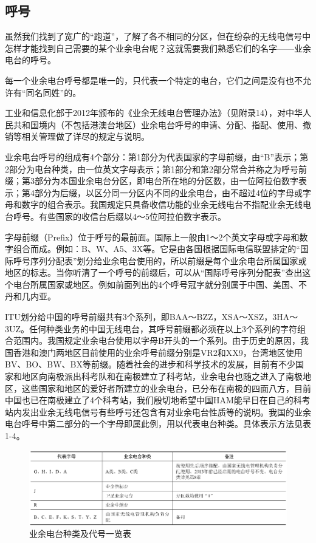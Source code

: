 \documentclass[12pt,UTF8]{ctexbook}
\begin{document}
\subsection{呼号}

虽然我们找到了宽广的“跑道”，了解了各不相同的分区，但在纷杂的无线电信号中怎样才能找到自己需要的某个业余电台呢？这就需要我们熟悉它们的名字——业余电台的呼号。

每一个业余电台呼号都是唯一的，只代表一个特定的电台，它们之间是没有也不允许有“同名同姓”的。

工业和信息化部于2012年颁布的《业余无线电台管理办法》（见附录14），对中华人民共和国境内（不包括港澳台地区）业余电台呼号的申请、分配、指配、使用、撤销等相关管理做了详尽的规定与说明。

业余电台呼号的组成有4个部分：第1部分为代表国家的字母前缀，由“B”表示；第2部分为电台种类，由一位英文字母表示；第1部分和第2部分常合并称之为呼号前缀；第3部分为本国业余电台分区，即电台所在地的分区数，由一位阿拉伯数字表示；第4部分为后缀，以区分同一分区内不同的业余电台，由不超过4位的字母或字母和数字的组合表示。我国规定只具备收信功能的业余无线电台不指配业余无线电台呼号。有些国家的收信台后缀以4～5位阿拉伯数字表示。

字母前缀（Prefix）位于呼号的最前面。国际上一般由1～2个英文字母或字母和数字组合而成。例如：B、W、A5、3X等。它是由各国根据国际电信联盟排定的“国际呼号序列分配表”划分给业余电台使用的，所以前缀是每个业余电台所属国家或地区的标志。当你听清了一个呼号的前缀后，可以从“国际呼号序列分配表”查出这个电台所属国家或地区。例如前面列出的4个呼号冠字就分别属于中国、美国、不丹和几内亚。

ITU划分给中国的呼号前缀共有3个系列，即BAA～BZZ，XSA～XSZ，3HA～3UZ。任何种类业务的中国无线电台，其呼号前缀都必须在以上3个系列的字符组合范围内。我国规定业余电台使用以字母B开头的一个系列。由于历史的原因，我国香港和澳门两地区目前使用的业余呼号前缀分别是VR2和XX9，台湾地区使用BV、BO、BW、BX等前缀。随着社会的进步和科学技术的发展，目前有不少国家和地区向南极派出科考队和在南极建立了科考站，业余电台也随之进入了南极地区，这些国家和地区的爱好者所建立的业余电台，已分布在南极的四面八方，目前中国也已在南极建立了4个科考站，我们殷切地希望中国HAM能早日在自己的科考站内发出业余无线电信号有些呼号还包含有对业余电台性质等的说明。我国的业余电台呼号中第二部分的一个字母即属此例，用以代表电台种类。具体表示方法见表1-4。

\begin{figure}[htbp]
	\centering
	\includegraphics[width=0.7\linewidth]{83}
	\caption{业余电台种类及代号一览表}
	\label{fig:1}
\end{figure}
\end{document}
